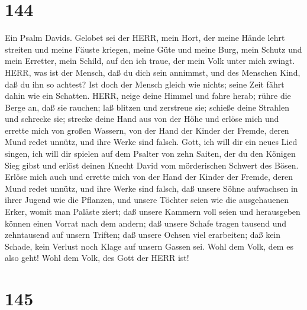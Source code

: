 \hypertarget{section-143}{%
\section{144}\label{section-143}}

 Ein Psalm Davids. Gelobet sei der HERR, mein Hort, der
meine Hände lehrt streiten und meine Fäuste kriegen,  meine
Güte und meine Burg, mein Schutz und mein Erretter, mein Schild, auf den
ich traue, der mein Volk unter mich zwingt.  HERR, was ist
der Mensch, daß du dich sein annimmst, und des Menschen Kind, daß du ihn
so achtest?  Ist doch der Mensch gleich wie nichts; seine
Zeit fährt dahin wie ein Schatten.  HERR, neige deine Himmel
und fahre herab; rühre die Berge an, daß sie rauchen;  laß
blitzen und zerstreue sie; schieße deine Strahlen und schrecke sie;
 strecke deine Hand aus von der Höhe und erlöse mich und
errette mich von großen Wassern, von der Hand der Kinder der Fremde,
 deren Mund redet unnütz, und ihre Werke sind falsch.
 Gott, ich will dir ein neues Lied singen, ich will dir
spielen auf dem Psalter von zehn Saiten,  der du den
Königen Sieg gibst und erlöst deinen Knecht David vom mörderischen
Schwert des Bösen.  Erlöse mich auch und errette mich von
der Hand der Kinder der Fremde, deren Mund redet unnütz, und ihre Werke
sind falsch,  daß unsere Söhne aufwachsen in ihrer Jugend
wie die Pflanzen, und unsere Töchter seien wie die ausgehauenen Erker,
womit man Paläste ziert;  daß unsere Kammern voll seien und
herausgeben können einen Vorrat nach dem andern; daß unsere Schafe
tragen tausend und zehntausend auf unsern Triften;  daß
unsere Ochsen viel erarbeiten; daß kein Schade, kein Verlust noch Klage
auf unsern Gassen sei.  Wohl dem Volk, dem es also geht!
Wohl dem Volk, des Gott der HERR ist!

\hypertarget{section-144}{%
\section{145}\label{section-144}}

